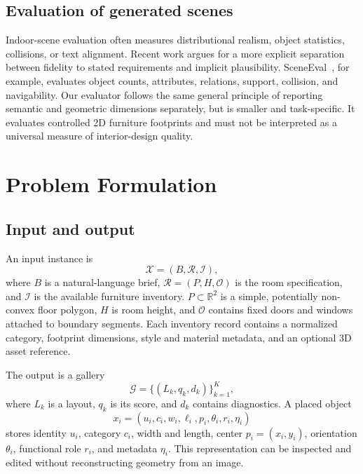 \documentclass[pdflatex,sn-mathphys-num]{sn-jnl}
\begin{document}
\subsection{Evaluation of generated scenes}

Indoor-scene evaluation often measures distributional realism, object statistics, collisions, or text alignment. Recent work argues for a more explicit separation between fidelity to stated requirements and implicit plausibility. SceneEval~\cite{tam2026sceneeval}, for example, evaluates object counts, attributes, relations, support, collision, and navigability. Our evaluator follows the same general principle of reporting semantic and geometric dimensions separately, but is smaller and task-specific. It evaluates controlled 2D furniture footprints and must not be interpreted as a universal measure of interior-design quality.

\section{Problem Formulation}\label{sec:problem}

\subsection{Input and output}

An input instance is
\begin{equation}
  \mathcal{X} = (B, \mathcal{R}, \mathcal{I}),
\end{equation}
where \(B\) is a natural-language brief, \(\mathcal{R}=(P,H,\mathcal{O})\) is the room specification, and \(\mathcal{I}\) is the available furniture inventory. \(P\subset\mathbb{R}^{2}\) is a simple, potentially non-convex floor polygon, \(H\) is room height, and \(\mathcal{O}\) contains fixed doors and windows attached to boundary segments. Each inventory record contains a normalized category, footprint dimensions, style and material metadata, and an optional 3D asset reference.

The output is a gallery
\begin{equation}
  \mathcal{G} = \{(L_k,q_k,d_k)\}_{k=1}^{K},
\end{equation}
where \(L_k\) is a layout, \(q_k\) is its score, and \(d_k\) contains diagnostics. A placed object
\begin{equation}
  x_i=(u_i,c_i,w_i,\ell_i,p_i,\theta_i,r_i,\eta_i)
\end{equation}
stores identity \(u_i\), category \(c_i\), width and length, center \(p_i=(x_i,y_i)\), orientation \(\theta_i\), functional role \(r_i\), and metadata \(\eta_i\). This representation can be inspected and edited without reconstructing geometry from an image.
\end{document}
